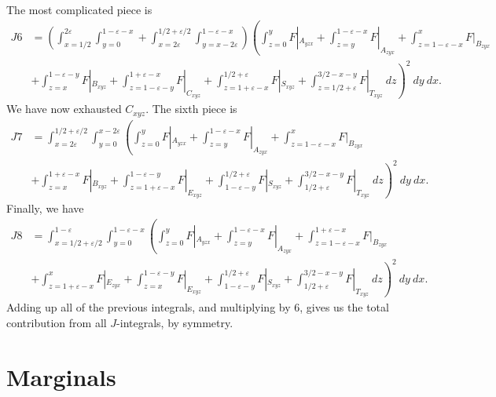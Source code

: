 \documentclass[12pt]{amsart}
\numberwithin{equation}{section}
\theoremstyle{plain}
\theoremstyle{definition}
\begin{document}
The most complicated piece is
\begin{align*}
J6 & =\left(\int_{x=1/2}^{2\varepsilon} \int_{y=0}^{1-\varepsilon-x} + \int_{x=2\varepsilon}^{1/2+\varepsilon/2}\int_{y=x-2\varepsilon}^{1-\varepsilon-x} \right) \left(\int_{z=0}^{y}F|_{A_{yzx}}+\int_{z=y}^{1-\varepsilon-x}F|_{A_{zyx}} +\int_{z=1-\varepsilon-x}^{x}F|_{B_{zyx}}  \right. \\ & \left. +\int_{z=x}^{1-\varepsilon-y}F|_{B_{xyz}} +\int_{z=1-\varepsilon-y}^{1+\varepsilon-x}F|_{C_{xyz}} + \int_{z=1+\varepsilon-x}^{1/2+\varepsilon}F|_{S_{xyz}}+ \int_{z=1/2+\varepsilon}^{3/2-x-y}F|_{T_{xyz}}\ dz \right)^{2}\ dy\ dx.
\end{align*}
We have now exhausted $C_{xyz}$.  The sixth piece is
\begin{align*}
J7 & = \int_{x=2\varepsilon}^{1/2+\varepsilon/2}\int_{y=0}^{x-2\varepsilon} \left(\int_{z=0}^{y}F|_{A_{yzx}}+\int_{z=y}^{1-\varepsilon-x}F|_{A_{zyx}} +\int_{z=1-\varepsilon-x}^{x}F|_{B_{zyx}} \right. \\ & \left. +\int_{z=x}^{1+\varepsilon-x}F|_{B_{xyz}} + \int_{z=1+\varepsilon-x}^{1-\varepsilon-y}F|_{E_{xyz}} + \int_{1-\varepsilon-y}^{1/2+\varepsilon}F|_{S_{xyz}}+ \int_{1/2+\varepsilon}^{3/2-x-y}F|_{T_{xyz}} \ dz \right)^{2}\ dy\ dx.
\end{align*}
Finally, we have
\begin{align*}
J8 & = \int_{x=1/2+\varepsilon/2}^{1-\varepsilon}\int_{y=0}^{1-\varepsilon-x} \left(\int_{z=0}^{y}F|_{A_{yzx}}+\int_{z=y}^{1-\varepsilon-x}F|_{A_{zyx}} +\int_{z=1-\varepsilon-x}^{1+\varepsilon-x}F|_{B_{zyx}} \right. \\ & \left. + \int_{z=1+\varepsilon-x}^{x}F|_{E_{zyx}} + \int_{z=x}^{1-\varepsilon-y}F|_{E_{xyz}} + \int_{1-\varepsilon-y}^{1/2+\varepsilon}F|_{S_{xyz}}+ \int_{1/2+\varepsilon}^{3/2-x-y}F|_{T_{xyz}}\ dz \right)^{2}\ dy\ dx.
\end{align*}
Adding up all of the previous integrals, and multiplying by 6, gives us the total contribution from all $J$-integrals, by symmetry.

\section{Marginals}
\end{document}

